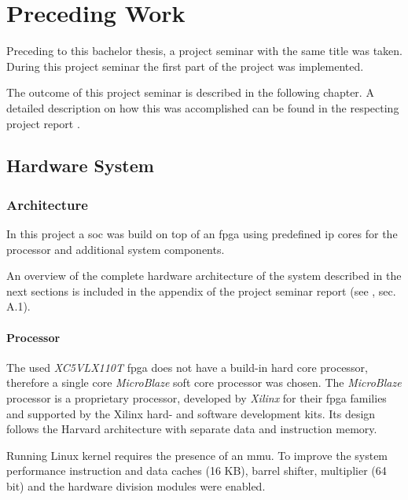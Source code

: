 \chapter{Preceding Work}
\label{cha:preceding}

Preceding to this bachelor thesis, a project seminar with the same title was taken. During this project seminar the first part of the project was implemented.

The outcome of this project seminar is described in the following chapter. A detailed description on how this was accomplished can be found in the respecting project report \cite{projectseminar}.
\\

\section{Hardware System}

\subsection{Architecture}

In this project a \gls{soc} was build on top of an \gls{fpga} using predefined \gls{ip} cores for the processor and additional system components.

An overview of the complete hardware architecture of the system described in the next sections is included in the appendix of the project seminar report (see \cite{projectseminar}, sec. A.1).
\\

\subsubsection{Processor}
\label{subsubsec:microblaze}

The used \textit{XC5VLX110T} \gls{fpga} does not have a build-in hard core processor, therefore a single core \textit{MicroBlaze} soft core processor was chosen. The \textit{MicroBlaze} processor is a proprietary processor, developed by \textit{Xilinx} for their \gls{fpga} families and supported by the Xilinx hard- and software development kits. Its design follows the Harvard architecture with separate data and instruction memory.

Running Linux kernel requires the presence of an \gls{mmu}. To improve the system performance instruction and data caches (16 KB), barrel shifter, multiplier (64 bit) and the hardware division modules were enabled.
\\


